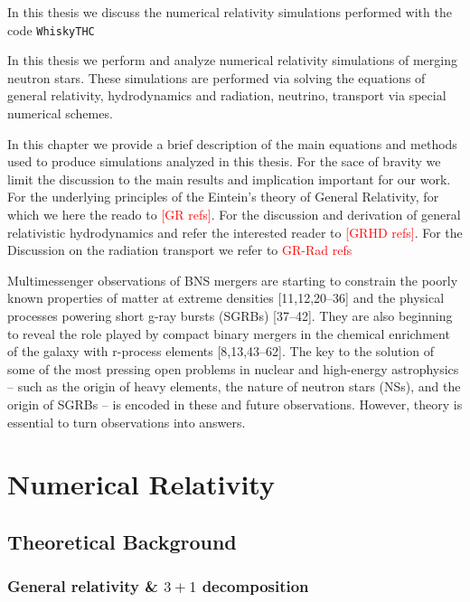 \documentclass[11pt,a4paper,headinclude=true,DIV=14,BCOR=8mm,chapterprefix,listof=totoc,twoside,openright,abstracton]{scrbook}
\newcommand{\red}[1]{\textcolor{red}{#1}}
\begin{document}
In this thesis we discuss the numerical relativity simulations performed with the code \texttt{WhiskyTHC}



In this thesis we perform and analyze numerical relativity simulations of merging neutron stars. 
These simulations are performed via solving the equations of general relativity, hydrodynamics and radiation, neutrino, transport via special numerical schemes. 

In this chapter we provide a brief description of the main equations and methods used to produce simulations analyzed in this thesis. 
For the sace of bravity we limit the discussion to the main results and implication important for our work.
For the underlying principles of the Eintein's theory of General Relativity, for which we here the reado to \red{[GR refs]}.
For the discussion and derivation of general relativistic hydrodynamics and refer the interested reader to \red{[GRHD refs]}.
For the Discussion on the radiation transport we refer to \red{GR-Rad refs}

Multimessenger observations of BNS mergers are starting to constrain the poorly known properties of
matter at extreme densities [11,12,20–36] and the physical processes powering short g-ray bursts (SGRBs)
[37–42]. They are also beginning to reveal the role played by compact binary mergers in the chemical
enrichment of the galaxy with r-process elements [8,13,43–62]. The key to the solution of some of the most
pressing open problems in nuclear and high-energy astrophysics – such as the origin of heavy elements,
the nature of neutron stars (NSs), and the origin of SGRBs – is encoded in these and future observations.
However, theory is essential to turn observations into answers.

\chapter{Numerical Relativity}

\section{Theoretical Background}

\subsection{General relativity \& $3+1$ decomposition}
\end{document}
